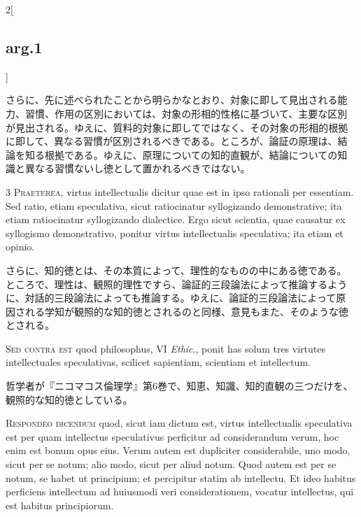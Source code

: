 \documentclass[paper=a4paper,fontsize=10pt,jafontsize=9pt,titlepage]{jlreq}
\begin{document}
\begin{paracol}{2}[\subsection{arg.1}]
\switchcolumn

さらに、先に述べられたことから明らかなとおり、対象に即して見出される能
力、習慣、作用の区別においては、対象の形相的性格に基づいて、主要な区別
が見出される。ゆえに、質料的対象に即してではなく、その対象の形相的根拠
に即して、異なる習慣が区別されるべきである。ところが、論証の原理は、結
論を知る根拠である。ゆえに、原理についての知的直観が、結論についての知
識と異なる習慣ないし徳として置かれるべきではない。


{\scshape 3 Praeterea}, virtus intellectualis dicitur quae est in ipso
 rationali per essentiam. Sed ratio, etiam speculativa, sicut
 ratiocinatur syllogizando demonstrative; ita etiam ratiocinatur
 syllogizando dialectice. Ergo sicut scientia, quae causatur ex
 syllogismo demonstrativo, ponitur virtus intellectualis speculativa;
 ita etiam et opinio.

\switchcolumn

さらに、知的徳とは、その本質によって、理性的なものの中にある徳である。
ところで、理性は、観照的理性ですら、論証的三段論法によって推論するよう
に、対話的三段論法によっても推論する。ゆえに、論証的三段論法によって原
因される学知が観照的な知的徳とされるのと同様、意見もまた、そのような徳
とされる。

\switchcolumn*[\subsection{s.c.}]

{\scshape Sed contra est} quod philosophus, VI {\itshape Ethic}.,
ponit has solum tres virtutes intellectuales speculativas, scilicet
sapientiam, scientiam et intellectum.

\switchcolumn

哲学者が『ニコマコス倫理学』第6巻で、知恵、知識、知的直観の三つだけを、
観照的な知的徳としている。


{\scshape Respondeo dicendum} quod, sicut iam dictum est, virtus
intellectualis speculativa est per quam intellectus speculativus
perficitur ad considerandum verum, hoc enim est bonum opus eius. Verum
autem est dupliciter considerabile, uno modo, sicut per se notum; alio
modo, sicut per aliud notum. Quod autem est per se notum, se habet ut
principium; et percipitur statim ab intellectu. Et ideo habitus
perficiens intellectum ad huiusmodi veri considerationem, vocatur
intellectus, qui est habitus principiorum.


\end{paracol}
\end{document}
